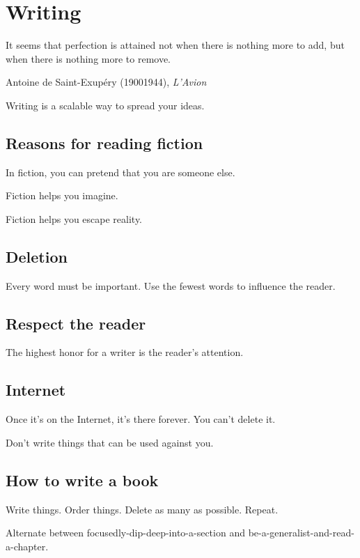 
\chapter{Writing}

\epigraph{It seems that perfection is attained not when there is nothing more to add, but when there is nothing more to remove.}{Antoine de Saint-Exup\'ery (1900\textendash{}1944), \emph{L'Avion}}

Writing is a scalable way to spread your ideas.

\section{Reasons for reading fiction}

In fiction, you can pretend that you are someone else.

Fiction helps you imagine.

Fiction helps you escape reality.

\section{Deletion}

Every word must be important.
Use the fewest words to influence the reader.

\section{Respect the reader}

The highest honor for a writer is the reader's attention.

\section{Internet}

Once it's on the Internet, it's there forever.
You can't delete it.

Don't write things that can be used against you.

\section{How to write a book}

Write things.
Order things.
Delete as many as possible.
Repeat.

Alternate between focusedly-dip-deep-into-a-section and be-a-generalist-and-read-a-chapter.

